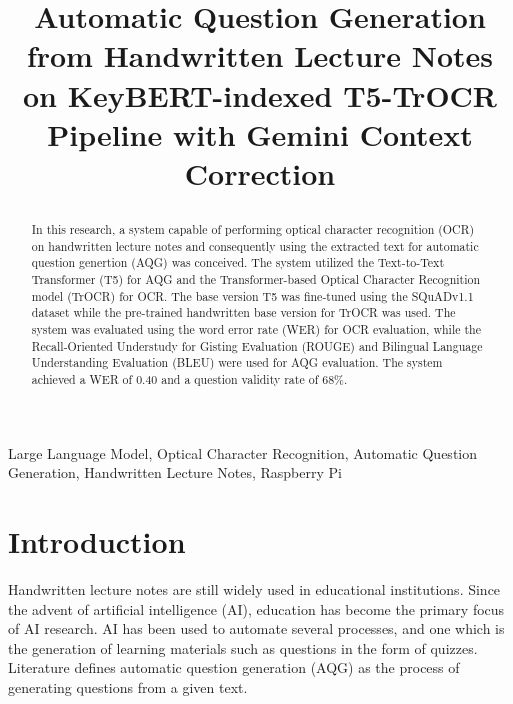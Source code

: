 \documentclass[conference]{IEEEtran}
\begin{document}
\title{Automatic Question Generation from Handwritten Lecture Notes on
KeyBERT-indexed T5-TrOCR Pipeline with Gemini Context Correction\\
\author{
}
}

\maketitle

\begin{abstract}
In this research, a system capable of performing optical character recognition
(OCR) on handwritten lecture notes and consequently using the extracted text for
automatic question genertion (AQG) was conceived. The system utilized the Text-to-Text
Transformer (T5) for AQG and the Transformer-based Optical Character Recognition 
model (TrOCR) for OCR. The base version T5 was fine-tuned
using the SQuADv1.1 dataset while the pre-trained handwritten base version for
TrOCR was used. The system was evaluated using the word error rate (WER) for
OCR evaluation, while the Recall-Oriented Understudy for Gisting Evaluation (ROUGE)
and Bilingual Language Understanding Evaluation (BLEU) were used for AQG evaluation. 
The system achieved a WER of 0.40 and a question validity rate of 68\%.
\end{abstract}

\begin{IEEEkeywords}
Large Language Model, Optical Character Recognition,
Automatic Question Generation, Handwritten Lecture Notes, Raspberry Pi
\end{IEEEkeywords}

\section{Introduction}
Handwritten lecture notes are still widely used in educational institutions.
Since the advent of artificial intelligence (AI), education has become
the primary focus of AI research. AI has been used to automate several processes,
and one which is the generation of learning materials such as questions in the
form of quizzes. Literature defines automatic question generation (AQG) as the
process of generating questions from a given text. 
\end{document}
